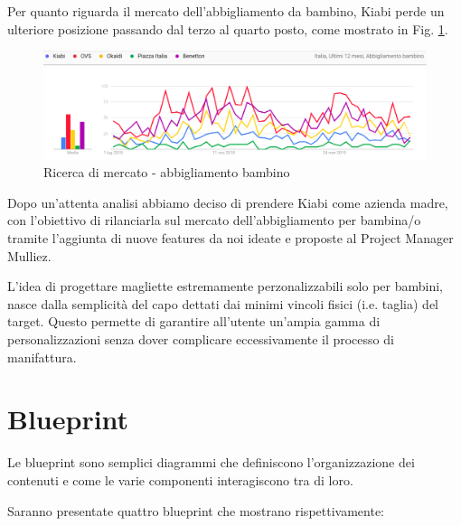 \documentclass[12pt,italian,]{report}
\begin{document}
Per quanto riguarda il mercato dell'abbigliamento da bambino, Kiabi perde un ulteriore posizione passando dal terzo al quarto posto, come mostrato in Fig. \ref{abbigliamento_bambino}.

\begin{figure}[h]
\centering
\includegraphics{img/abbigliamento_bambino.png}
\caption{Ricerca di mercato - abbigliamento bambino}
\label{abbigliamento_bambino}
\end{figure}

Dopo un'attenta analisi abbiamo deciso di prendere Kiabi come azienda
madre, con l'obiettivo di rilanciarla sul mercato dell'abbigliamento per
bambina/o tramite l'aggiunta di nuove features da noi ideate e proposte
al Project Manager Mulliez.

L'idea di progettare magliette estremamente perzonalizzabili solo per
bambini, nasce dalla semplicità del capo dettati dai minimi vincoli fisici
(i.e. taglia) del target. Questo permette di garantire all'utente
un'ampia gamma di personalizzazioni senza dover complicare eccessivamente
il processo di manifattura.
\section{Blueprint}\label{Blueprint}
Le blueprint sono semplici diagrammi che definiscono l'organizzazione dei contenuti e come le varie componenti interagiscono tra di loro.

Saranno presentate quattro blueprint che mostrano rispettivamente:
\end{document}
